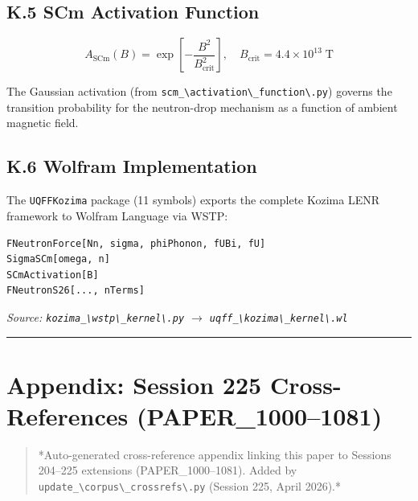 \documentclass[12pt,a4paper]{article}
\begin{document}
\subsection{K.5 SCm Activation Function}

\begin{equation}
A_{\mathrm{SCm}}(B) = \exp\!\left[-\frac{B^2}{B_{\mathrm{crit}}^2}\right], \quad B_{\mathrm{crit}} = 4.4 \times 10^{13} \;\text{T}
\end{equation}

The Gaussian activation (from \texttt{scm\_\textbackslash {activation\textbackslash \_function\textbackslash }.py}) governs the transition probability for the neutron-drop mechanism as a function of ambient magnetic field.

\subsection{K.6 Wolfram Implementation}

The \texttt{UQFFKozima} package (11 symbols) exports the complete Kozima LENR framework to Wolfram Language via WSTP:

\begin{verbatim}
FNeutronForce[Nn, sigma, phiPhonon, fUBi, fU]
SigmaSCm[omega, n]
SCmActivation[B]
FNeutronS26[..., nTerms]
\end{verbatim}

\emph{Source: \texttt{kozima\_\textbackslash {wstp\textbackslash \_kernel\textbackslash }.py} $\to$ \texttt{uqff\_\textbackslash {kozima\textbackslash \_kernel\textbackslash }.wl}}

\medskip\hrule\medskip

\section{Appendix: Session 225 Cross-References (PAPER\_1000--1081)}

\begin{quote}
*Auto-generated cross-reference appendix linking this paper to
Sessions 204--225 extensions (PAPER\_1000--1081). Added by
\texttt{update\_\textbackslash {corpus\textbackslash \_crossrefs\textbackslash }.py} (Session 225, April 2026).*
\end{quote}
\end{document}
